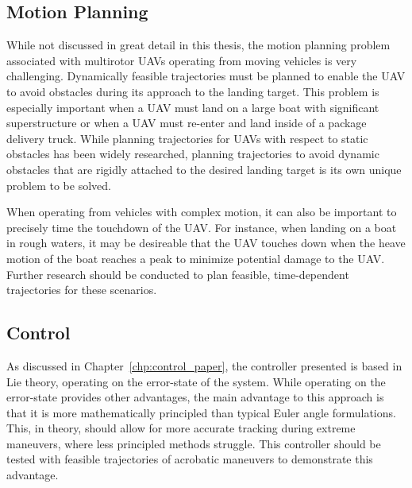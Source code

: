 \subsection{Motion Planning}
\label{sec:future_motion_planning}
While not discussed in great detail in this thesis, the motion planning problem
associated with multirotor UAVs operating from moving vehicles is very
challenging.
Dynamically feasible trajectories must be planned to enable the UAV to avoid
obstacles during its approach to the landing target.
This problem is especially important when a UAV must land on a large boat
with significant superstructure or when a UAV must re-enter and land inside of a
package delivery truck. While planning trajectories for UAVs with respect to
static obstacles has been widely researched, planning trajectories to avoid
dynamic obstacles that are rigidly attached to the desired landing target is its
own unique problem to be solved.

When operating from vehicles with complex motion, 
it can also be important to precisely time the touchdown of the UAV.
For instance, when landing on a boat in rough
waters, it may be desireable that the UAV touches down when the heave motion of the
boat reaches a peak to minimize potential damage to the UAV.
Further research should be conducted to plan feasible, time-dependent
trajectories for these scenarios.



\subsection{Control}
As discussed in Chapter~\ref{chp:control_paper}, the controller presented is
based in Lie theory, operating on the error-state of the system.
While operating on the error-state provides other
advantages, the main advantage to this approach is that it is more
mathematically principled than typical Euler angle formulations. This, in
theory, should allow for more accurate tracking during extreme maneuvers, where
less principled methods struggle.
This controller should be tested with feasible trajectories of acrobatic
maneuvers to demonstrate this advantage.

